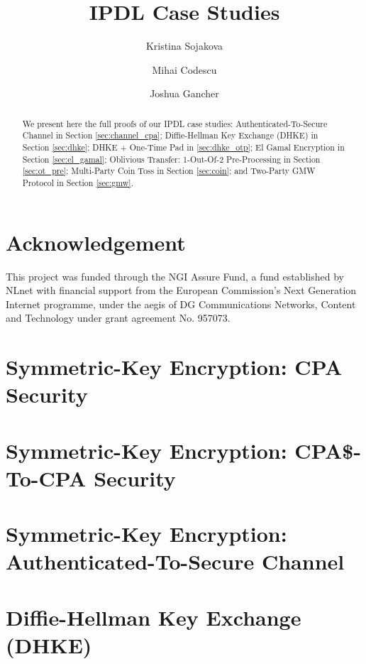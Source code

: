 \documentclass[11pt,hidelinks]{article}
\newcommand{\ipdl}{\textsf{IPDL} }
\begin{document}
\title{\ipdl Case Studies}
\author{Kristina Sojakova \and Mihai Codescu \and Joshua Gancher}

\maketitle

\begin{abstract}
We present here the full proofs of our \ipdl case studies: Authenticated-To-Secure Channel in Section \ref{sec:channel_cpa};
Diffie-Hellman Key Exchange (DHKE) in Section \ref{sec:dhke}; DHKE + One-Time Pad in \ref{sec:dhke_otp}; El Gamal Encryption in Section \ref{sec:el_gamal}; Oblivious Transfer: 1-Out-Of-2 Pre-Processing in Section \ref{sec:ot_pre}; Multi-Party Coin Toss in Section \ref{sec:coin}; and Two-Party GMW Protocol in Section \ref{sec:gmw}.
\end{abstract}

\section*{\small Acknowledgement}
This project was funded through the NGI Assure Fund, a fund established by NLnet with financial support from the European Commission's Next Generation Internet programme, under the aegis of DG Communications Networks, Content and Technology under grant agreement No. 957073.

\section{Symmetric-Key Encryption: CPA Security}\label{sec:cpa}


\section{Symmetric-Key Encryption: CPA\$-To-CPA Security}\label{sec:pseudo_cpa}


\section{Symmetric-Key Encryption: Authenticated-To-Secure Channel}\label{sec:channel_cpa}


\section{Diffie-Hellman Key Exchange (DHKE)}\label{sec:dhke}

\end{document}
